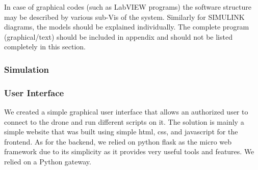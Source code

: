 \documentclass[../main.tex]{subfiles}
\begin{document}
\begin{newrequirements}
\begin{todolist}
    \item In case of graphical codes (such as 
        LabVIEW programs) the software 
        structure may be described by various 
        sub-Vis of the system. Similarly for 
        SIMULINK diagrams, the models should be 
        explained individually. The complete 
        program (graphical/text) should be 
        included in appendix and should not be 
        listed completely in this section. 
                
    \end{todolist}
\end{newrequirements}

\subsubsection{Simulation}

\lipsum[5]

\subsubsection{User Interface}

We created a simple graphical user interface that allows an authorized user 
to connect to the drone and run different scripts on it. 
The solution is mainly a simple website that was built using simple html, css, and javascript for the frontend. As for the backend, we relied on python flask as the micro web framework due to its simplicity as it provides very useful tools and features. 
We relied on a Python gateway.
\end{document}
